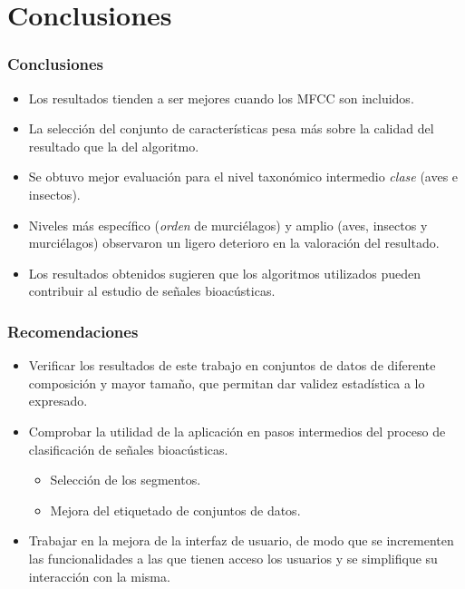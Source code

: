 \section*{Conclusiones}\label{sec:conclusion}

\begin{frame}
    \frametitle{Conclusiones}

    \begin{itemize}
        \item<2-> Los resultados tienden a ser mejores cuando los MFCC son incluidos.
        \item<3-> La selección del conjunto de características pesa más sobre la calidad del resultado que la del algoritmo.
        \item<4-> Se obtuvo mejor evaluación para el nivel taxonómico intermedio \textit{clase} (aves e insectos).
        \item<5-> Niveles más específico (\textit{orden} de murciélagos) y amplio (aves, insectos y murciélagos) observaron un ligero deterioro en la valoración del resultado.
    \end{itemize}

    \begin{itemize}
        \item<6-> Los resultados obtenidos sugieren que los algoritmos utilizados pueden contribuir al estudio de señales bioacústicas.
    \end{itemize}

\end{frame}

\begin{frame}
    \frametitle{Recomendaciones}

    \begin{itemize}
        \item<2-> Verificar los resultados de este trabajo en conjuntos de datos de diferente composición y mayor tamaño, que permitan dar validez estadística a lo expresado.
        \item<3-> Comprobar la utilidad de la aplicación en pasos intermedios del proceso de clasificación de señales bioacústicas.
        \begin{itemize}
            \item<4-> Selección de los segmentos.
            \item<5-> Mejora del etiquetado de conjuntos de datos.
        \end{itemize}
        \item<6-> Trabajar en la mejora de la interfaz de usuario, de modo que se incrementen las funcionalidades a las que tienen acceso los usuarios y se simplifique su interacción con la misma.
    \end{itemize}

\end{frame}